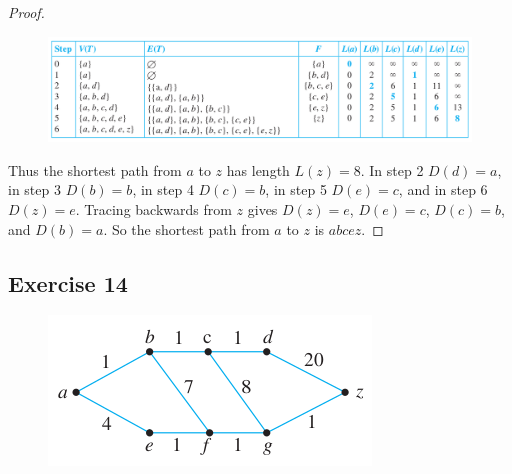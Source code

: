 \documentclass[14pt]{extarticle}
\begin{document}
\begin{proof}
    \begin{figure}[ht!]
        \centering
        \includegraphics[scale=0.5]{../images/10.6.13.2.png}
    \end{figure}

    Thus the shortest path from \(a\) to \(z\) has length \(L(z) = 8\). In step 2 \(D(d) = a\), in step 3 \(D(b) = b\), in step 4
    \(D(c) = b\), in step 5 \(D(e) = c\), and in step 6 \(D(z) = e\). Tracing backwards from \(z\) gives \(D(z) = e\),
    \(D(e) = c\), \(D(c) = b\), and \(D(b) = a\). So the shortest path from \(a\) to \(z\) is \(abcez\).
\end{proof}

\subsection{Exercise 14}
\begin{figure}[ht!]
    \centering
    \includegraphics[scale=0.6]{../images/10.6.14.png}
\end{figure}
\end{document}
